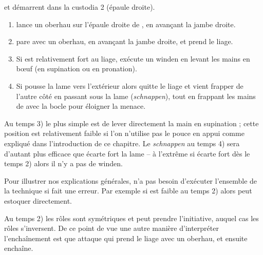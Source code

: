 \begin{technique}[Liegniczer 1]

\A et \D démarrent dans la custodia 2 (épaule droite).

\begin{enumerate}
	\item \A lance un oberhau sur l'épaule droite de \D, en avançant la jambe droite.
	
	\item \D pare avec un oberhau, en avançant la jambe droite, et prend le liage.
	
	\item {}
		Si \D est relativement fort au liage, \A exécute un winden en levant les mains en bœuf (en supination ou en pronation).
	
	\item {}
		Si \D pousse la lame vers l'extérieur alors \A quitte le liage et vient frapper \D de l'autre côté en passant sous la lame (\emph{schnappen}),
		tout en frappant les mains de \D avec la bocle pour éloigner la menace.
\end{enumerate}

Au temps 3) le plus simple est de lever directement la main en supination ; cette position est relativement faible si l'on n'utilise pas le pouce en appui comme expliqué dans l'introduction de ce chapitre.
Le \emph{schnappen} au temps 4) sera d'autant plus efficace que \D écarte fort la lame – à l'extrême si \D écarte fort dès le temps 2) alors il n'y a pas de winden.

Pour illustrer nos explications générales, \A n'a pas besoin d'exécuter l'ensemble de la technique si \D fait une erreur.
Par exemple si \D est faible au temps 2) alors \A peut estoquer directement.

Au temps 2) les rôles sont symétriques et \D peut prendre l'initiative, auquel cas les rôles s'inversent.
De ce point de vue une autre manière d'interpréter l'enchaînement est que \D attaque \A qui prend le liage avec un oberhau, et ensuite enchaîne.


\end{technique}
